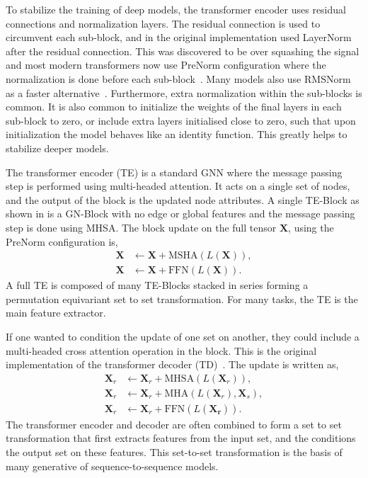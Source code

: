 To stabilize the training of deep models, the transformer encoder uses residual connections and normalization layers.
The residual connection is used to circumvent each sub-block, and in the original implementation used LayerNorm~ after the residual connection.
This was discovered to be over squashing the signal and most modern transformers now use PreNorm configuration where the normalization is done before each sub-block~.
Many models also use RMSNorm as a faster alternative~.
Furthermore, extra normalization within the sub-blocks is common.
It is also common to initialize the weights of the final layers in each sub-block to zero, or include extra layers initialised close to zero, such that upon initialization the model behaves like an identity function.
This greatly helps to stabilize deeper models.

The transformer encoder (TE) is a standard GNN where the message passing step is performed using multi-headed attention.
It acts on a single set of nodes, and the output of the block is the updated node attributes.
A single TE-Block as shown in  is a GN-Block with no edge or global features and the message passing step is done using MHSA.
The block update on the full tensor $\mathbf{X}$, using the PreNorm configuration is,
\begin{equation}
\begin{aligned}
    \mathbf{X} & \leftarrow \mathbf{X} + \text{MSHA}(L(\mathbf{X})), \\
    \mathbf{X} & \leftarrow \mathbf{X} + \text{FFN}(L(\mathbf{X})).
\end{aligned}
\end{equation}
A full TE is composed of many TE-Blocks stacked in series forming a permutation equivariant set to set transformation.
For many tasks, the TE is the main feature extractor.

If one wanted to condition the update of one set on another, they could include a multi-headed cross attention operation in the block.
This is the original implementation of the transformer decoder (TD)~.
The update is written as,
\begin{equation}
\begin{aligned}
    \mathbf{X}_r & \leftarrow \mathbf{X}_r + \text{MHSA}(L(\mathbf{X}_r)), \\
    \mathbf{X}_r & \leftarrow \mathbf{X}_r + \text{MHA}(L(\mathbf{X}_r), \mathbf{X}_s), \\
    \mathbf{X}_r & \leftarrow \mathbf{X}_r + \text{FFN}(L(\mathbf{X_r})).
\end{aligned}
\end{equation}
The transformer encoder and decoder are often combined to form a set to set transformation that first extracts features from the input set, and the conditions the output set on these features.
This set-to-set transformation is the basis of many generative of sequence-to-sequence models.

